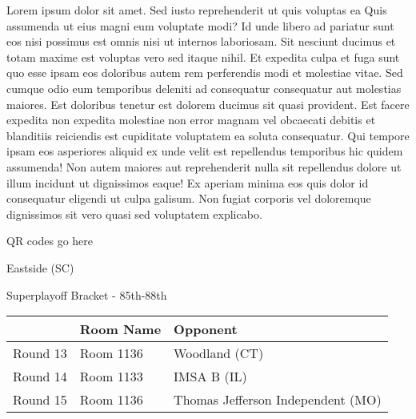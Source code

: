 \documentclass{article}%
\begin{document}
\vspace*{8pt}%
\linebreak%
\newline%
\newline%
Lorem ipsum dolor sit amet. Sed iusto reprehenderit ut quis voluptas ea Quis assumenda ut eius magni eum voluptate modi? Id unde libero ad pariatur sunt eos nisi possimus est omnis nisi ut internos laboriosam. Sit nesciunt ducimus et totam maxime est voluptas vero sed itaque nihil. Et expedita culpa et fuga sunt quo esse ipsam eos doloribus autem rem perferendis modi et molestiae vitae.\newline%
\newline%
Sed cumque odio eum temporibus deleniti ad consequatur consequatur aut molestias maiores. Est doloribus tenetur est dolorem ducimus sit quasi provident. Est facere expedita non expedita molestiae non error magnam vel obcaecati debitis et blanditiis reiciendis est cupiditate voluptatem ea soluta consequatur. Qui tempore ipsam eos asperiores aliquid ex unde velit est repellendus temporibus hic quidem assumenda!\newline%
\newline%
Non autem maiores aut reprehenderit nulla sit repellendus dolore ut illum incidunt ut dignissimos eaque! Ex aperiam minima eos quis dolor id consequatur eligendi ut culpa galisum. Non fugiat corporis vel doloremque dignissimos sit vero quasi sed voluptatem explicabo.\newline%
\newline%
%
\vspace*{30pt}%
\begin{center}%
\begin{Huge}%
QR codes go here%
\end{Huge}%
\end{center}%
\newpage%
\begin{center}%
\begin{Huge}%
Eastside (SC)%
\end{Huge}%
\vspace*{8pt}%
\linebreak%
\begin{Large}%
Superplayoff Bracket {-} 85th{-}88th%
\end{Large}%
\end{center}%
%
\begin{tabularx}{\textwidth}{|c|Y|Y|}%
\hline%
&Room Name&Opponent\\%
\hline%
Round 13&Room 1136&Woodland (CT)\\%
Round 14&Room 1133&IMSA B (IL)\\%
Round 15&Room 1136&Thomas Jefferson Independent (MO)\\%
\hline%
\end{tabularx}%
\end{document}
